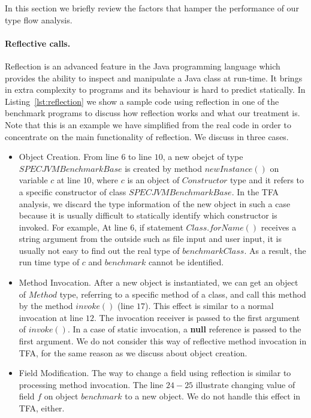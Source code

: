 \documentclass{fac}
\begin{document}
In this section we briefly review the factors that hamper the performance of our type flow analysis.

\paragraph{Reflective calls.} Reflection is an advanced feature in the Java programming language which provides the ability to inspect and manipulate a Java class at run-time. It brings in extra complexity to programs and its behaviour is hard to predict statically. In Listing~\ref{lst:reflection} we show a sample code using reflection in one of the benchmark programs to discuss how reflection works and what our treatment is. Note that this is an example we have simplified from the real code in order to concentrate on the main functionality of reflection. We discuss in three cases.
\begin{itemize}
\item Object Creation.
From line $6$ to line $10$, a new obejct of type $SPECJVMBenchmarkBase$ is created by method $newInstance()$ on variable $c$ at line $10$, where $c$ is an object of $Constructor$ type and it refers to a specific constructor of class $SPECJVMBenchmarkBase$. In the TFA analysis, we discard the type information of the new object in such a case because it is usually difficult to statically identify which constructor is invoked. For example, At line $6$, if statement $Class.forName()$ receives a string argument from the outside such as file input and user input, it is usually not easy to find out the real type of $benchmarkClass$. As a result, the run time type of $c$ and $benchmark$ cannot be identified.
\item Method Invocation.
After a new object is instantiated, we can get an object of $Method$ type, referring to a specific method of a class, and call this method by the method $invoke()$ (line $17$). This effect is similar to a normal invocation at line $12$. The invocation receiver is passed to the first argument of $invoke()$. In a case of static invocation, a \textbf{null} reference is passed to the first argument. We do not consider this way of reflective method invocation in TFA, for the same reason as we discuss about object creation.
\item Field Modification.
The way to change a field using reflection is similar to processing method invocation. The line $24-25$ illustrate changing value of field $f$ on object $benchmark$ to a new object. %
We do not handle this effect in TFA, either.
\end{itemize}
\end{document}
